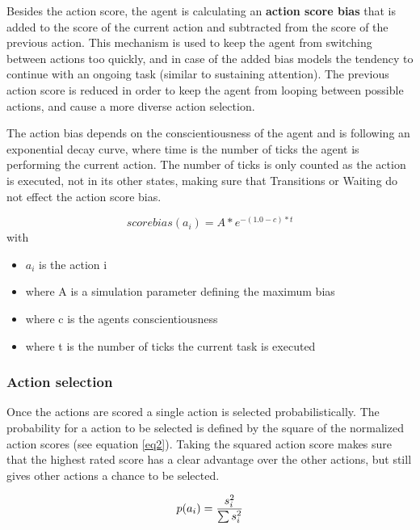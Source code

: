 \bb

Besides the action score, the agent is calculating an \textbf{action score bias}
that is added to the score of the current action and subtracted from the score
of the previous action. This mechanism is used to keep the agent from switching
between actions too quickly, and in case of the added bias models the tendency to
continue with an ongoing task (similar to sustaining attention). The previous
action score is reduced in order to keep the agent from looping between possible
actions, and cause a more diverse action selection.

\bb

The action bias depends on the conscientiousness of the agent and is following an
exponential decay curve, where time is the number of ticks the agent is performing
the current action. The number of ticks is only counted as the action is executed,
not in its other states, making sure that Transitions or Waiting do not effect the
action score bias.

\begin{equation}
    \label{eq1}
    scorebias(a_i) = A * e^{-(1.0 - c) * t}
\end{equation}
with
\begin{itemize}
    \item $a_i$ is the action i
    \item where A is a simulation parameter defining the maximum bias
    \item where c is the agents conscientiousness
    \item where t is the number of ticks the current task is executed
\end{itemize}

\subsubsection{Action selection}
Once the actions are scored a single action is selected probabilistically. The
probability for a action to be selected is defined by the square of the normalized
action scores (see equation \ref{eq2}). Taking the squared action score makes sure
that the highest rated score has a clear advantage over the other actions, but still
gives other actions a chance to be selected.

\begin{equation}
    \label{eq2}
    p(a_i) = \frac{s_i^2}{\sum s_i^2} \\
\end{equation}

